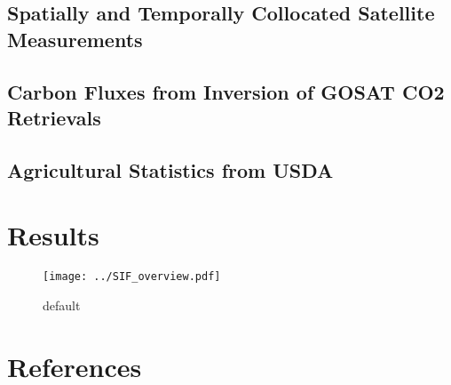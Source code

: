 \documentclass[preprint, a4paper, 10pt, times]{elsarticle}
\begin{document}
\subsection{Spatially and Temporally Collocated Satellite Measurements}
\subsection{Carbon Fluxes from Inversion of GOSAT CO2 Retrievals}
\subsection{Agricultural Statistics from USDA}


\section{Results}

\begin{figure}[htbp]
\centering
\texttt{[image: ../SIF\_overview.pdf]}
\caption{default}
\label{default}
\end{figure}

\section*{References}

\end{document}
